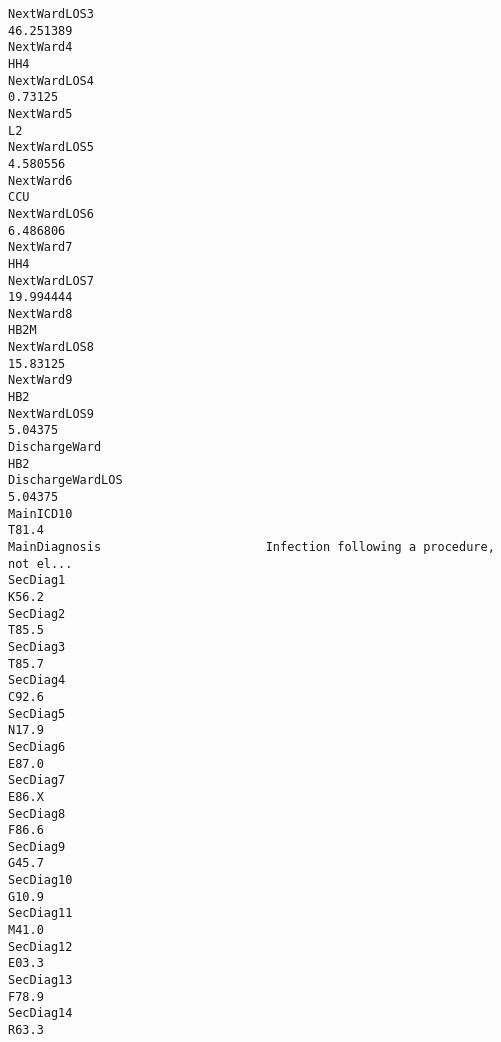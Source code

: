 \documentclass[hf]{ceurart}
\begin{document}
\begin{verbatim}
NextWardLOS3                                                                46.251389
NextWard4                                                                         HH4
NextWardLOS4                                                                  0.73125
NextWard5                                                                          L2
NextWardLOS5                                                                 4.580556
NextWard6                                                                         CCU
NextWardLOS6                                                                 6.486806
NextWard7                                                                         HH4
NextWardLOS7                                                                19.994444
NextWard8                                                                        HB2M
NextWardLOS8                                                                 15.83125
NextWard9                                                                         HB2
NextWardLOS9                                                                  5.04375
DischargeWard                                                                     HB2
DischargeWardLOS                                                              5.04375
MainICD10                                                                       T81.4
MainDiagnosis                       Infection following a procedure, not el...
SecDiag1                                                                        K56.2
SecDiag2                                                                        T85.5
SecDiag3                                                                        T85.7
SecDiag4                                                                        C92.6
SecDiag5                                                                        N17.9
SecDiag6                                                                        E87.0
SecDiag7                                                                        E86.X
SecDiag8                                                                        F86.6
SecDiag9                                                                        G45.7
SecDiag10                                                                       G10.9
SecDiag11                                                                       M41.0
SecDiag12                                                                       E03.3
SecDiag13                                                                       F78.9
SecDiag14                                                                       R63.3

\end{verbatim}
\end{document}
